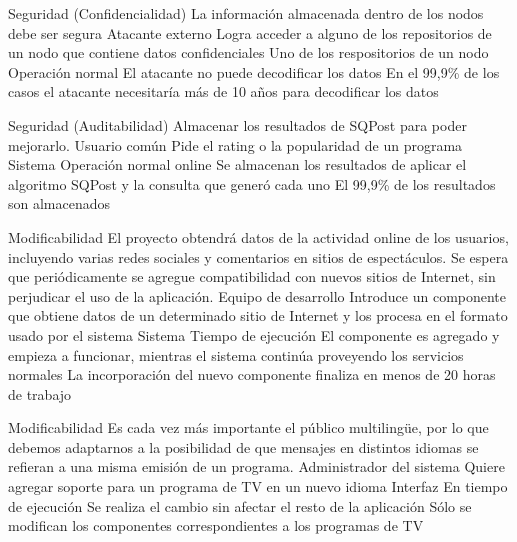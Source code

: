 \begin{enumerate}
\QA
  {Seguridad (Confidencialidad)} %
  {La información almacenada dentro de los nodos debe ser segura} %
  {Atacante externo} %
  {Logra acceder a alguno de los repositorios de un nodo que contiene datos confidenciales} %
  {Uno de los respositorios de un nodo} %
  {Operación normal} %
  {El atacante no puede decodificar los datos} %
  {En el 99,9\% de los casos el atacante necesitaría más de 10 años para decodificar los datos} %

\QA
  {Seguridad (Auditabilidad)} %
  {Almacenar los resultados de SQPost para poder mejorarlo.} %
  {Usuario común} %
  {Pide el rating o la popularidad de un programa} %
  {Sistema} %
  {Operación normal online} %
  {Se almacenan los resultados de aplicar el algoritmo SQPost y la consulta que generó cada uno} %
  {El 99,9\% de los resultados son almacenados} %



\QA
  {Modificabilidad} %
  {El proyecto obtendrá datos de la actividad online de los usuarios, incluyendo varias redes sociales y comentarios en sitios de espectáculos. Se espera que periódicamente se agregue compatibilidad con nuevos sitios de Internet, sin perjudicar el uso de la aplicación.} %
  {Equipo de desarrollo} %
  {Introduce un componente que obtiene datos de un determinado sitio de Internet y los procesa en el formato usado por el sistema} %
  {Sistema} %
  {Tiempo de ejecución} %
  {El componente es agregado y empieza a funcionar, mientras el sistema continúa proveyendo los servicios normales} %
  {La incorporación del nuevo componente finaliza en menos de 20 horas de trabajo} %

\QA
  {Modificabilidad} %
  {Es cada vez más importante el público multilingüe, por lo que debemos adaptarnos a la posibilidad de que mensajes en distintos idiomas se refieran a una misma emisión de un programa.} %
  {Administrador del sistema} %
  {Quiere agregar soporte para un programa de TV en un nuevo idioma} %
  {Interfaz} %
  {En tiempo de ejecución} %
  {Se realiza el cambio sin afectar el resto de la aplicación} %
  {Sólo se modifican los componentes correspondientes a los programas de TV} %


\end{enumerate}
